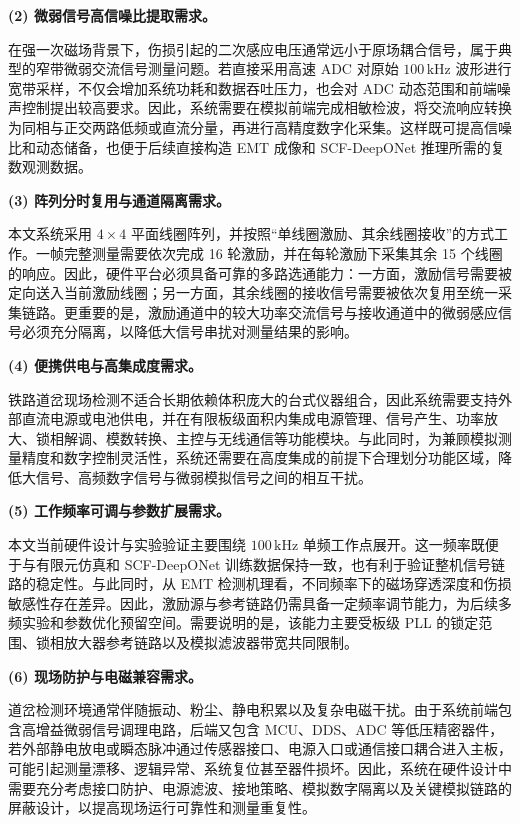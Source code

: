\textbf{(2) 微弱信号高信噪比提取需求。}

在强一次磁场背景下，伤损引起的二次感应电压通常远小于原场耦合信号，属于典型的窄带微弱交流信号测量问题。若直接采用高速 ADC 对原始 $100\,\mathrm{kHz}$ 波形进行宽带采样，不仅会增加系统功耗和数据吞吐压力，也会对 ADC 动态范围和前端噪声控制提出较高要求。因此，系统需要在模拟前端完成相敏检波，将交流响应转换为同相与正交两路低频或直流分量，再进行高精度数字化采集。这样既可提高信噪比和动态储备，也便于后续直接构造 EMT 成像和 SCF-DeepONet 推理所需的复数观测数据。

\textbf{(3) 阵列分时复用与通道隔离需求。}

本文系统采用 $4\times4$ 平面线圈阵列，并按照``单线圈激励、其余线圈接收''的方式工作。一帧完整测量需要依次完成 16 轮激励，并在每轮激励下采集其余 15 个线圈的响应。因此，硬件平台必须具备可靠的多路选通能力：一方面，激励信号需要被定向送入当前激励线圈；另一方面，其余线圈的接收信号需要被依次复用至统一采集链路。更重要的是，激励通道中的较大功率交流信号与接收通道中的微弱感应信号必须充分隔离，以降低大信号串扰对测量结果的影响。

\textbf{(4) 便携供电与高集成度需求。}

铁路道岔现场检测不适合长期依赖体积庞大的台式仪器组合，因此系统需要支持外部直流电源或电池供电，并在有限板级面积内集成电源管理、信号产生、功率放大、锁相解调、模数转换、主控与无线通信等功能模块。与此同时，为兼顾模拟测量精度和数字控制灵活性，系统还需要在高度集成的前提下合理划分功能区域，降低大信号、高频数字信号与微弱模拟信号之间的相互干扰。

\textbf{(5) 工作频率可调与参数扩展需求。}

本文当前硬件设计与实验验证主要围绕 $100\,\mathrm{kHz}$ 单频工作点展开。这一频率既便于与有限元仿真和 SCF-DeepONet 训练数据保持一致，也有利于验证整机信号链路的稳定性。与此同时，从 EMT 检测机理看，不同频率下的磁场穿透深度和伤损敏感性存在差异。因此，激励源与参考链路仍需具备一定频率调节能力，为后续多频实验和参数优化预留空间。需要说明的是，该能力主要受板级 PLL 的锁定范围、锁相放大器参考链路以及模拟滤波器带宽共同限制。

\textbf{(6) 现场防护与电磁兼容需求。}

道岔检测环境通常伴随振动、粉尘、静电积累以及复杂电磁干扰。由于系统前端包含高增益微弱信号调理电路，后端又包含 MCU、DDS、ADC 等低压精密器件，若外部静电放电或瞬态脉冲通过传感器接口、电源入口或通信接口耦合进入主板，可能引起测量漂移、逻辑异常、系统复位甚至器件损坏。因此，系统在硬件设计中需要充分考虑接口防护、电源滤波、接地策略、模拟数字隔离以及关键模拟链路的屏蔽设计，以提高现场运行可靠性和测量重复性。

